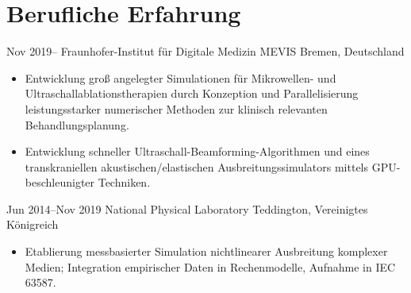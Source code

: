 \documentclass[german, print]{cv-style-wide-de}
\begin{document}
\section{Berufliche Erfahrung}
\begin{entrylist}



\entry
  {Nov 2019--}
  {Fraunhofer-Institut für Digitale Medizin MEVIS}
  {Bremen, Deutschland}
  {%
   \begin{itemize}[topsep=0pt]
     \item Entwicklung groß angelegter Simulationen für Mikrowellen- und Ultraschallablationstherapien durch Konzeption und Parallelisierung leistungsstarker numerischer Methoden zur klinisch relevanten Behandlungsplanung.
     \item Entwicklung schneller Ultraschall-Beamforming-Algorithmen und eines transkraniellen akustischen/elastischen Ausbreitungssimulators mittels GPU-beschleunigter Techniken.
   \end{itemize}}

\entry
  {Jun 2014--Nov 2019}
  {National Physical Laboratory}
  {Teddington, Vereinigtes Königreich}
  {%
   \begin{itemize}
     \item Etablierung messbasierter Simulation nichtlinearer Ausbreitung komplexer Medien; Integration empirischer Daten in Rechenmodelle, Aufnahme in IEC 63587.
   \end{itemize}}


\end{entrylist}
\end{document}
